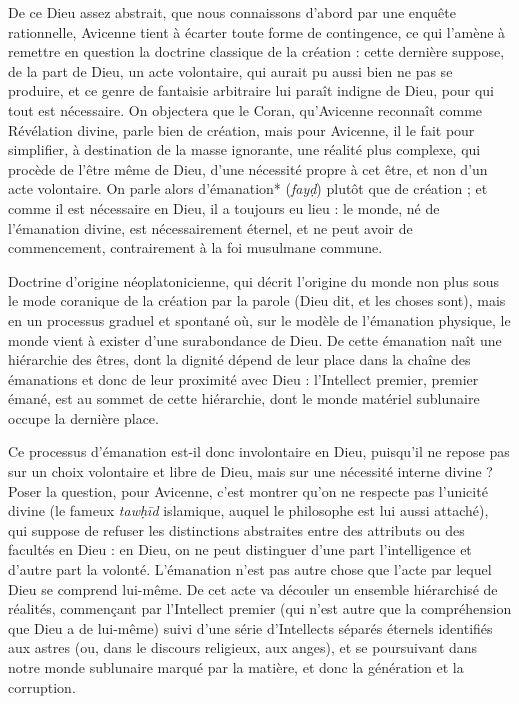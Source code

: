 De ce Dieu assez abstrait, que nous connaissons d'abord par une enquête
rationnelle, Avicenne tient à écarter toute forme de contingence, ce
qui l'amène à remettre en question la doctrine classique de la création
: cette dernière suppose, de la part de Dieu, un acte volontaire, qui
aurait pu aussi bien ne pas se produire, et ce genre de fantaisie
arbitraire lui paraît indigne de Dieu, pour qui tout est nécessaire. On
objectera que le Coran, qu'Avicenne reconnaît comme Révélation divine,
parle bien de création, mais pour Avicenne, il le fait pour simplifier,
à destination de la masse ignorante, une réalité plus complexe, qui
procède de l'être même de Dieu, d'une nécessité propre à cet être, et
non d'un acte volontaire. On parle alors d'émanation* (\emph{fayḍ})
plutôt que de création ; et comme il est nécessaire en Dieu, il a
toujours eu lieu : le monde, né de l'émanation divine, est
nécessairement éternel, et ne peut avoir de commencement, contrairement
à la foi musulmane commune.
\begin{Def}  Doctrine d’origine néoplatonicienne, qui décrit l’origine du monde non plus sous le mode coranique de la création par la parole (Dieu dit, et les choses sont), mais en un processus graduel et spontané où, sur le modèle de l’émanation physique, le monde vient à exister d’une surabondance de Dieu. De cette émanation naît une hiérarchie des êtres, dont la dignité dépend de leur place dans la chaîne des émanations et donc de leur proximité avec Dieu : l’Intellect premier, premier émané, est au sommet de cette hiérarchie, dont le monde matériel sublunaire occupe la dernière place. 
\end{Def}
Ce processus d'émanation est-il donc involontaire en Dieu, puisqu'il ne
repose pas sur un
choix volontaire et libre de Dieu, mais sur une nécessité interne divine ? Poser la question,
pour Avicenne, c'est montrer qu'on ne respecte pas l'unicité divine (le
fameux \emph{tawḥīd} islamique, auquel le philosophe est lui aussi
attaché), qui suppose de refuser les distinctions abstraites entre des
attributs ou des facultés en Dieu : en Dieu, on ne peut distinguer d'une
part l'intelligence et d'autre part la volonté. L'émanation n'est pas
autre chose que l'acte par lequel Dieu se comprend lui-même. De cet acte
va découler un ensemble hiérarchisé de réalités, commençant par
l'Intellect premier (qui n'est autre que la compréhension que Dieu a de
lui-même) suivi d'une série d'Intellects séparés éternels identifiés aux
astres (ou, dans le discours religieux, aux anges), et se poursuivant
dans notre monde sublunaire marqué par la matière, et donc la génération
et la corruption.

